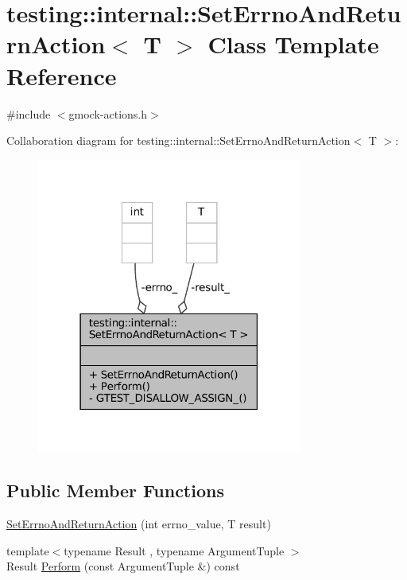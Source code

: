 \hypertarget{classtesting_1_1internal_1_1SetErrnoAndReturnAction}{}\section{testing\+:\+:internal\+:\+:Set\+Errno\+And\+Return\+Action$<$ T $>$ Class Template Reference}
\label{classtesting_1_1internal_1_1SetErrnoAndReturnAction}


{\ttfamily \#include $<$gmock-\/actions.\+h$>$}



Collaboration diagram for testing\+:\+:internal\+:\+:Set\+Errno\+And\+Return\+Action$<$ T $>$\+:
\nopagebreak
\begin{figure}[H]
\begin{center}
\leavevmode
\includegraphics[width=247pt]{classtesting_1_1internal_1_1SetErrnoAndReturnAction__coll__graph}
\end{center}
\end{figure}
\subsection*{Public Member Functions}
\begin{DoxyCompactItemize}
\item 
\hyperlink{classtesting_1_1internal_1_1SetErrnoAndReturnAction_abfe5a194a9b8f2b303c635ad99b3a257}{Set\+Errno\+And\+Return\+Action} (int errno\+\_\+value, T result)
\item 
{\footnotesize template$<$typename Result , typename Argument\+Tuple $>$ }\\Result \hyperlink{classtesting_1_1internal_1_1SetErrnoAndReturnAction_a44025d0d124cab72878bf6bdb12c3693}{Perform} (const Argument\+Tuple \&) const
\end{DoxyCompactItemize}
